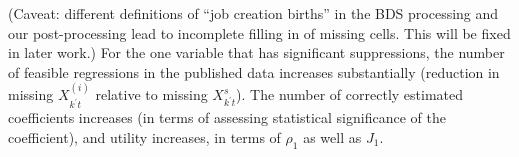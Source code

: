 (Caveat: different definitions of ``job creation births'' in the BDS processing and our 
post-processing lead to incomplete filling in of missing cells. This will be fixed in later work.) For 
the one variable that has significant suppressions, the number of feasible regressions in the 
published data increases substantially (reduction in missing $X_{k^\prime t}^{(i)}$ relative to 
missing $X_{k^\prime t}^{s}$). The number of correctly estimated coefficients increases (in 
terms of assessing statistical significance of the coefficient), and utility increases, in terms of 
$\rho_1$ as well as $J_1$.